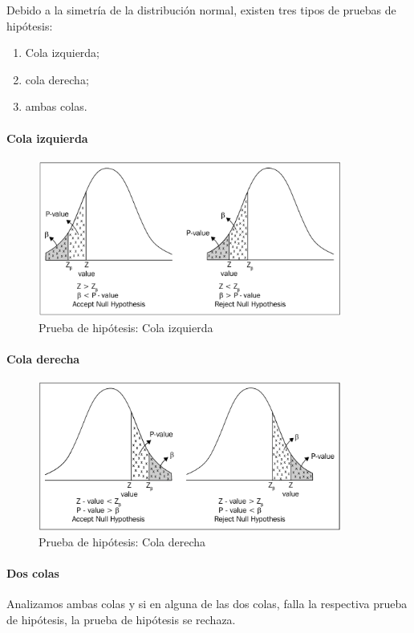 Debido a la simetría de la distribución normal, existen tres tipos de pruebas de hipótesis:
\begin{enumerate}
	\item Cola izquierda;
	\item cola derecha;
	\item ambas colas.
\end{enumerate}


\paragraph{Cola izquierda}
\begin{figure}
	\centering
	\includegraphics[width=10cm,keepaspectratio=true]{./images/kum0403.png}
	\caption{Prueba de hipótesis: Cola izquierda}
	\label{kum0403}
\end{figure}


\paragraph{Cola derecha}
\begin{figure}
	\centering
	\includegraphics[width=10cm,keepaspectratio=true]{./images/kum0404.png}
	\caption{Prueba de hipótesis: Cola derecha}
	\label{kum0403}
\end{figure}


\paragraph{Dos colas}
Analizamos ambas colas y si en alguna de las dos colas, falla la respectiva prueba de hipótesis, la prueba de hipótesis se rechaza.

